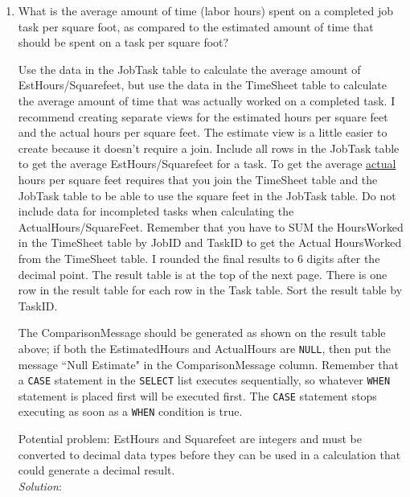 \documentclass{article}
\begin{document}
\begin{enumerate}
  \newpage
  \item What is the average amount of time (labor hours) spent on a completed job task per square foot, as compared to the estimated amount of time that should be spent on a task per square foot?

  Use the data in the JobTask table to calculate the average amount of EstHours/Squarefeet, but use the data in the TimeSheet table to calculate the average amount of time that was actually worked on a completed task. I recommend creating separate views for the estimated hours per square feet and the actual hours per square feet. The estimate view is a little easier to create because it doesn’t require a join. Include all rows in the JobTask table to get the average EstHours/Squarefeet for a task. To get the average \underline{actual} hours per square feet requires that you join the TimeSheet table and the JobTask table to be able to use the square feet in the JobTask table. Do not include data for incompleted tasks when calculating the ActualHours/SquareFeet. Remember that you have to SUM the HoursWorked in the TimeSheet table by JobID and TaskID to get the Actual HoursWorked from the TimeSheet table. I rounded the final results to 6 digits after the decimal point. The result table is at the top of the next page. There is one row in the result table for each row in the Task table. Sort the result table by TaskID.

  The ComparisonMessage should be generated as shown on the result table above; if both the EstimatedHours and ActualHours are \texttt{NULL}, then put the message ``Null Estimate" in the ComparisonMessage column. Remember that a \texttt{CASE} statement in the \texttt{SELECT} list executes sequentially, so whatever \texttt{WHEN} statement is placed first will be executed first. The \texttt{CASE} statement stops executing as soon as a \texttt{WHEN} condition is true.

  Potential problem: EstHours and Squarefeet are integers and must be converted to decimal data types before they can be used in a calculation that could generate a decimal result.\\
  \textit{Solution}:
  \begin{verbatim}

  \end{verbatim}


\end{enumerate}
\end{document}
